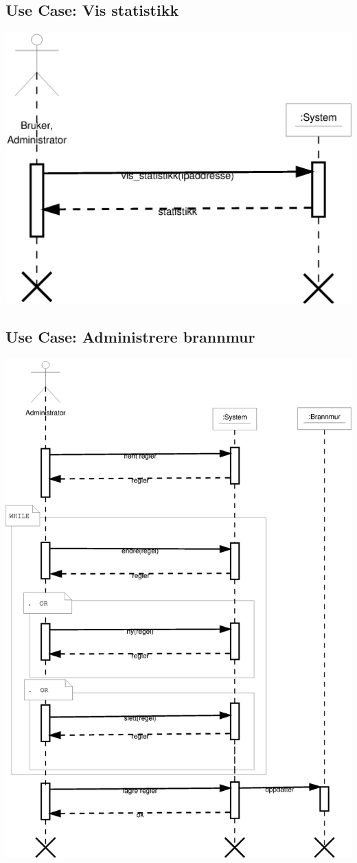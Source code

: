 \documentclass[nynorsk,12pt,a4paper]{article}
\begin{document}
\subsection{Use Case: Vis statistikk}
\includegraphics[scale=0.5]{gfx/SSD_UC2_vis_statistikk.eps}
\subsection{Use Case: Administrere brannmur}
\includegraphics[scale=0.5]{gfx/SSD_UC3_administrer_brannmur.eps}
\end{document}
